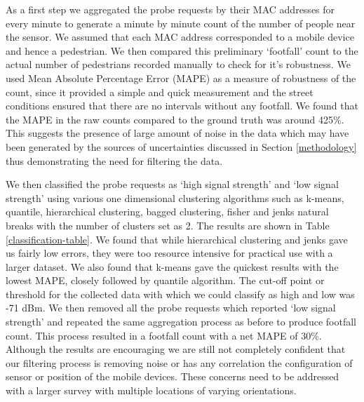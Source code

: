 As a first step we aggregated the probe requests by their MAC addresses for every minute to generate a minute by minute count of the number of people near the sensor.
We assumed that each MAC address corresponded to a mobile device and hence a pedestrian.
We then compared this preliminary `footfall' count to the actual number of pedestrians recorded manually to check for it's robustness.
We used Mean Absolute Percentage Error (MAPE) as a measure of robustness of the count, since it provided a simple and quick measurement and the street conditions ensured that there are no intervals without any footfall.
We found that the MAPE in the raw counts compared to the ground truth was around 425\%.
 This suggests the presence of large amount of noise in the data which may have been generated by the sources of uncertainties discussed in Section \ref{methodology} thus demonstrating the need for filtering the data.

We then classified the probe requests as `high signal strength' and `low signal strength' using various one dimensional clustering algorithms such as k-means, quantile, hierarchical clustering, bagged clustering, fisher and jenks natural breaks with the number of clusters set as 2.
The results are shown in Table \ref{classification-table}.
We found that while hierarchical clustering and jenks gave us fairly low errors, they were too resource intensive for practical use with a larger dataset.
We also found that k-means gave the quickest results with the lowest MAPE, closely followed by quantile algorithm.
The cut-off point or threshold for the collected data with which we could classify as high and low was -71 dBm.
We then removed all the probe requests which reported `low signal strength' and repeated the same aggregation process as before to produce footfall count.
This process resulted in a footfall count with a net MAPE of 30\%.
Although the results are encouraging we are still not completely confident that our filtering process is removing noise or has any correlation the configuration of sensor or position of the mobile devices.
These concerns need to be addressed with a larger survey with multiple locations of varying orientations.

